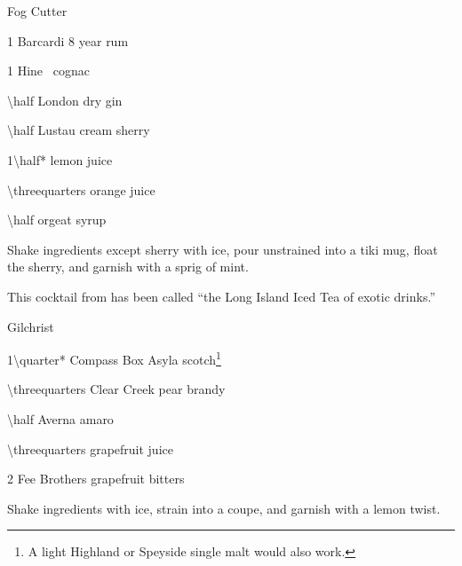 \begin{PDTCocktail}{Fog Cutter}
	\begin{Ingredients}\normalsize
	\item \SI{1}{\oz} Barcardi 8 year rum
	\item \SI{1}{\oz} Hine \vsop\ cognac
	\item \SI{\half}{\oz} London dry gin
	\item \SI{\half}{\oz} Lustau cream sherry
	\item \SI{1\half*}{\oz} lemon juice
	\item \SI{\threequarters}{\oz} orange juice
	\item \SI{\half}{\oz} orgeat syrup
	\end{Ingredients}
	
	\begin{Instructions}\small
	Shake ingredients except sherry with ice, pour unstrained into a tiki mug, float the sherry, and garnish with a sprig of mint.
	
	This cocktail from  has been called ``the Long Island Iced Tea of exotic drinks.''
	\end{Instructions}
\end{PDTCocktail}

\begin{PDTCocktail}{Gilchrist}
	\begin{Ingredients}
	\item \SI{1\quarter*}{\oz} Compass Box Asyla scotch\footnote{A light Highland or Speyside single malt would also work.}
	\item \SI{\threequarters}{\oz} Clear Creek pear brandy
	\item \SI{\half}{\oz} Averna amaro
	\item \SI{\threequarters}{\oz} grapefruit juice
	\item 2 \si{\dashes} Fee Brothers grapefruit bitters
	\end{Ingredients}
	
	\begin{Instructions}
	Shake ingredients with ice, strain into a coupe, and garnish with a lemon twist.
	\end{Instructions}
\end{PDTCocktail}

